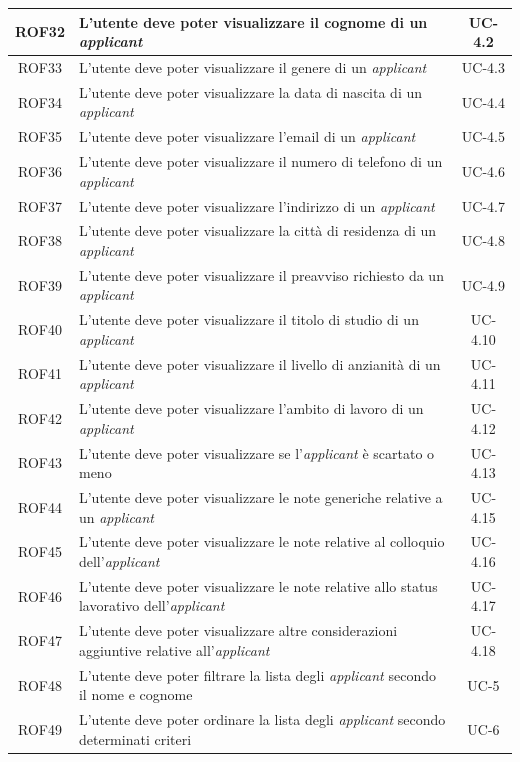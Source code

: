 \begin{center}
\begin{tabularx}{\textwidth}{|c|X|c|}
		\hline
		ROF32 & L'utente deve poter visualizzare il cognome di un \textit{applicant}  & UC-4.2 \\
		\hline
		ROF33 & L'utente deve poter visualizzare il genere di un \textit{applicant} & UC-4.3\\
		\hline
		ROF34 & L'utente deve poter visualizzare la data di nascita di un \textit{applicant}& UC-4.4 \\
		\hline
		ROF35 & L'utente deve poter visualizzare l'email di un \textit{applicant}& UC-4.5\\
		\hline
		ROF36 & L'utente deve poter visualizzare il numero di telefono di un \textit{applicant}& UC-4.6\\
		\hline
		ROF37 & L'utente deve poter visualizzare l'indirizzo di un \textit{applicant}& UC-4.7\\
		\hline
		ROF38 & L'utente deve poter visualizzare la città di residenza di un \textit{applicant}&  UC-4.8\\
		\hline
		ROF39 & L'utente deve poter visualizzare il preavviso richiesto da un \textit{applicant} & UC-4.9 \\
		\hline
		ROF40 &  L'utente deve poter visualizzare il titolo di studio di un \textit{applicant} & UC-4.10\\
		\hline 
		ROF41 &  L'utente deve poter visualizzare il livello di anzianità di un \textit{applicant}& UC-4.11\\
		\hline
		ROF42 &  L'utente deve poter visualizzare l'ambito di lavoro di un \textit{applicant}& UC-4.12\\
		\hline
		ROF43 &  L'utente deve poter visualizzare se l'\textit{applicant} è scartato o meno & UC-4.13\\
		\hline
		ROF44 &  L'utente deve poter visualizzare le note generiche relative a un \textit{applicant} & UC-4.15\\
		\hline
		ROF45 &  L'utente deve poter visualizzare le note relative al colloquio dell'\textit{applicant} & UC-4.16\\
		\hline
		ROF46 &  L'utente deve poter visualizzare le note relative allo status lavorativo dell'\textit{applicant}& UC-4.17\\
		\hline
		ROF47 & L'utente deve poter visualizzare altre considerazioni aggiuntive relative all'\textit{applicant} & UC-4.18\\
		\hline
		ROF48 & L'utente deve poter filtrare la lista degli \textit{applicant} secondo il nome e cognome & UC-5\\
		\hline
		ROF49 & L'utente deve poter ordinare la lista degli \textit{applicant} secondo determinati criteri & UC-6 \\

\end{tabularx}
\end{center}
